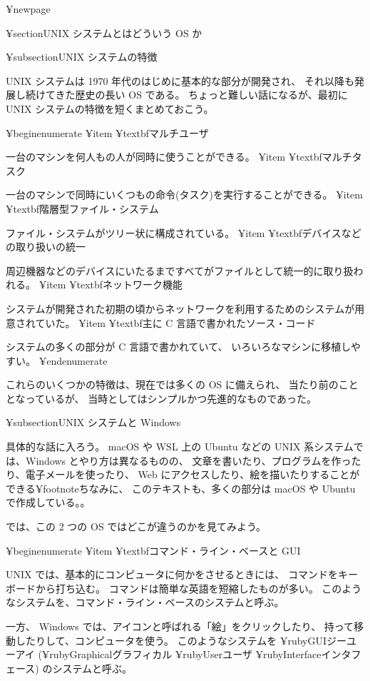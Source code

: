 ¥newpage

¥section{UNIX システムとはどういう OS か}

¥subsection{UNIX システムの特徴}

 UNIX システムは 1970 年代のはじめに基本的な部分が開発され、
それ以降も発展し続けてきた歴史の長い OS である。
ちょっと難しい話になるが、最初に UNIX システムの特徴を短くまとめておこう。

¥begin{enumerate}
¥item ¥textbf{マルチユーザ}

一台のマシンを何人もの人が同時に使うことができる。
¥item ¥textbf{マルチタスク}

一台のマシンで同時にいくつもの命令(タスク)を実行することができる。
¥item ¥textbf{階層型ファイル・システム}

ファイル・システムがツリー状に構成されている。
¥item ¥textbf{デバイスなどの取り扱いの統一}

周辺機器などのデバイスにいたるまですべてがファイルとして統一的に取り扱われる。
¥item ¥textbf{ネットワーク機能}

システムが開発された初期の頃からネットワークを利用するためのシステムが用意されていた。
¥item ¥textbf{主に C 言語で書かれたソース・コード}

システムの多くの部分が C 言語で書かれていて、
いろいろなマシンに移植しやすい。
¥end{enumerate}

これらのいくつかの特徴は、現在では多くの OS に備えられ、
当たり前のこととなっているが、
当時としてはシンプルかつ先進的なものであった。

¥subsection{UNIX システムと Windows}

具体的な話に入ろう。
macOS や WSL 上の Ubuntu などの UNIX 系システムでは、Windows とやり方は異なるものの、
文章を書いたり、プログラムを作ったり、電子メールを使ったり、
Web にアクセスしたり、絵を描いたりすることができる¥footnote{ちなみに、
このテキストも、多くの部分は macOS や Ubuntu で作成している。}。

では、この 2 つの OS ではどこが違うのかを見てみよう。

¥begin{enumerate}
¥item ¥textbf{コマンド・ライン・ベースと GUI}

 UNIX では、基本的にコンピュータに何かをさせるときには、
コマンドをキーボードから打ち込む。
コマンドは簡単な英語を短縮したものが多い。
このようなシステムを、コマンド・ライン・ベースのシステムと呼ぶ。

一方、 Windows では、アイコンと呼ばれる「絵」をクリックしたり、
持って移動したりして、コンピュータを使う。
このようなシステムを ¥ruby{GUI}{ジーユーアイ}
(¥ruby{Graphical}{グラフィカル} ¥ruby{User}{ユーザ} ¥ruby{Interface}{インタフェース})
のシステムと呼ぶ。

